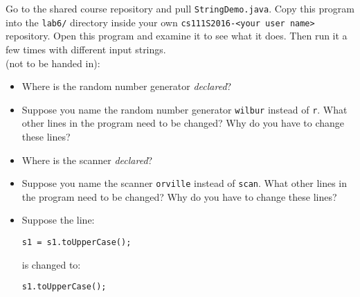 Go to the shared course repository and pull {\tt StringDemo.java}. Copy this program into the {\tt lab6/} directory
inside your own {\tt cs111S2016-<your user name>} repository.  Open this program and examine it to see what it does.
Then run it a few times with different input strings.\\

(not to be handed in):
\begin{itemize}
\item Where is the random number generator {\em declared}?
\item Suppose you name the random number generator {\tt wilbur} instead of {\tt r}.
What other lines in the program need to be changed? Why do you have to change these lines?
\item Where is the scanner {\em declared}?
\item Suppose you name the scanner {\tt orville} instead of {\tt scan}.
What other lines in the program need to be changed? Why do you have to change these lines?
\item
Suppose the line:

\vspace*{-.2in}
\begin{center}
\verb$s1 = s1.toUpperCase();$
\end{center}
\vspace*{-.2in}

is changed to:

\vspace*{-.2in}
\begin{center}
\verb$s1.toUpperCase();$
\end{center}


\end{itemize}
